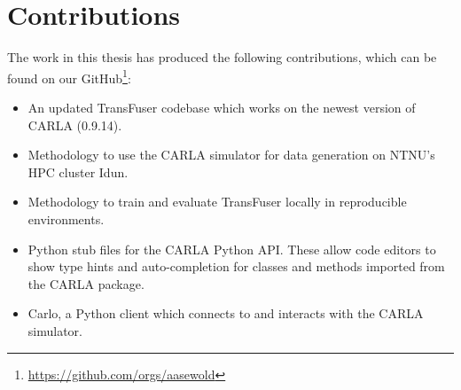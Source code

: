 \section{Contributions}

The work in this thesis has produced the following contributions,
which can be found on our GitHub\footnote{\url{https://github.com/orgs/aasewold}}:

\begin{itemize}
    \item An updated TransFuser codebase which works on the newest version of CARLA (0.9.14).
    \item Methodology to use the CARLA simulator for data generation on NTNU's HPC cluster Idun.
    \item Methodology to train and evaluate TransFuser locally in reproducible environments.
    \item Python stub files for the CARLA Python API. These allow code editors to show type hints and auto-completion for classes and methods imported from the CARLA package.
    \item Carlo, a Python client which connects to and interacts with the CARLA simulator.
\end{itemize}
